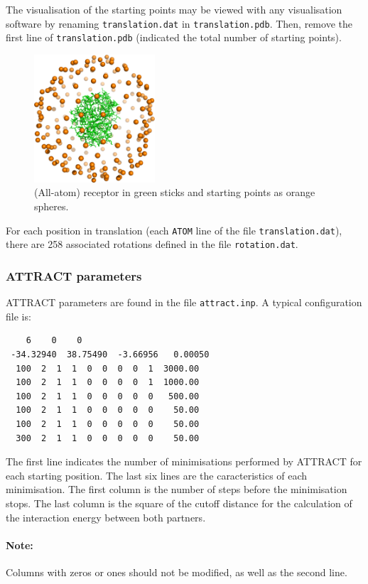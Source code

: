 \documentclass[12pt,a4paper]{article}
\begin{document}
The visualisation of the starting points may be viewed with any visualisation software by renaming {\tt translation.dat} in {\tt translation.pdb}.
Then, remove the first line of {\tt translation.pdb} (indicated the total number of starting points).

\begin{figure}[htbp]
\center
\includegraphics*[width=0.4\textwidth]{img/1CGI_translation.png}
\caption{(All-atom) receptor in green sticks and starting points as orange spheres.}
\end{figure}

For each position in translation (each {\tt ATOM} line of the file {\tt translation.dat}), 
there are 258 associated rotations defined in the file {\tt rotation.dat}. 

\subsubsection{ATTRACT parameters}

ATTRACT parameters are found in the file {\tt attract.inp}. A typical configuration file is:
\begin{verbatim}
    6    0    0
 -34.32940  38.75490  -3.66956   0.00050
  100  2  1  1  0  0  0  0  1  3000.00   
  100  2  1  1  0  0  0  0  1  1000.00   
  100  2  1  1  0  0  0  0  0   500.00   
  100  2  1  1  0  0  0  0  0    50.00   
  100  2  1  1  0  0  0  0  0    50.00   
  300  2  1  1  0  0  0  0  0    50.00
\end{verbatim}

The first line indicates the number of minimisations performed by ATTRACT
for each starting position.  The last six lines are the caracteristics of
each minimisation. The first column is the number of steps before the
minimisation stops.  The last column is the square of the cutoff distance
for the calculation of the interaction energy between both partners.

\paragraph{Note:} Columns with zeros or ones should not be modified, as
well as the second line.
\end{document}
